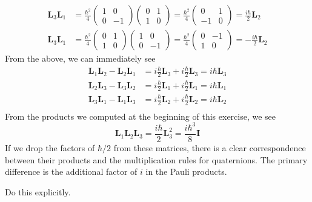 \documentclass[../road-to-reality.tex]{subfiles}
\begin{document}
\begin{questions}
\begin{solution}
\begin{align*}
		\mathbf{L}_3\mathbf{L}_1 &= \frac{\hbar^2}{4}\begin{pmatrix}1 & 0 \\ 0 & -1\end{pmatrix}\begin{pmatrix}0 & 1 \\ 1 & 0\end{pmatrix} = \frac{\hbar^2}{4}\begin{pmatrix}0 & 1 \\ -1 & 0\end{pmatrix} = {\frac{i\hbar}{2}\mathbf{L}_2} \\
		\mathbf{L}_3\mathbf{L}_1 &= \frac{\hbar^2}{4}\begin{pmatrix}0 & 1 \\ 1 & 0\end{pmatrix}\begin{pmatrix}1 & 0 \\ 0 & -1\end{pmatrix} = \frac{\hbar^2}{4}\begin{pmatrix}0 & -1 \\ 1 & 0\end{pmatrix} = {-\frac{i\hbar}{2}\mathbf{L}_2}
	\end{align*}
	From the above, we can immediately see
	\begin{align*}
		\mathbf{L}_1\mathbf{L}_2 - \mathbf{L}_2\mathbf{L}_1 &= i\frac{\hbar}{2}\mathbf{L}_3 + i\frac{\hbar}{2}\mathbf{L}_3 = i\hbar\mathbf{L}_3 \\
		\mathbf{L}_2\mathbf{L}_3 - \mathbf{L}_3\mathbf{L}_2 &= i\frac{\hbar}{2}\mathbf{L}_1 + i\frac{\hbar}{2}\mathbf{L}_1 = i\hbar\mathbf{L}_1 \\
		\mathbf{L}_3\mathbf{L}_1 - \mathbf{L}_1\mathbf{L}_3 &= i\frac{\hbar}{2}\mathbf{L}_2 + i\frac{\hbar}{2}\mathbf{L}_2 = i\hbar\mathbf{L}_2 \\
	\end{align*}
	From the products we computed at the beginning of this exercise, we see
	\[
		\mathbf{L}_1\mathbf{L}_2\mathbf{L}_3 = \frac{i\hbar}{2}\mathbf{L}_3^2 = \frac{i\hbar^3}{8}\mathbf{I}
	\]
	If we drop the factors of $\hbar/2$ from these matrices, there is a clear correspondence between their products and the multiplication rules for quaternions. The primary difference is the additional factor of $i$ in the Pauli products.
\end{solution}

\question Do this explicitly.
	

\end{questions}
\end{document}
